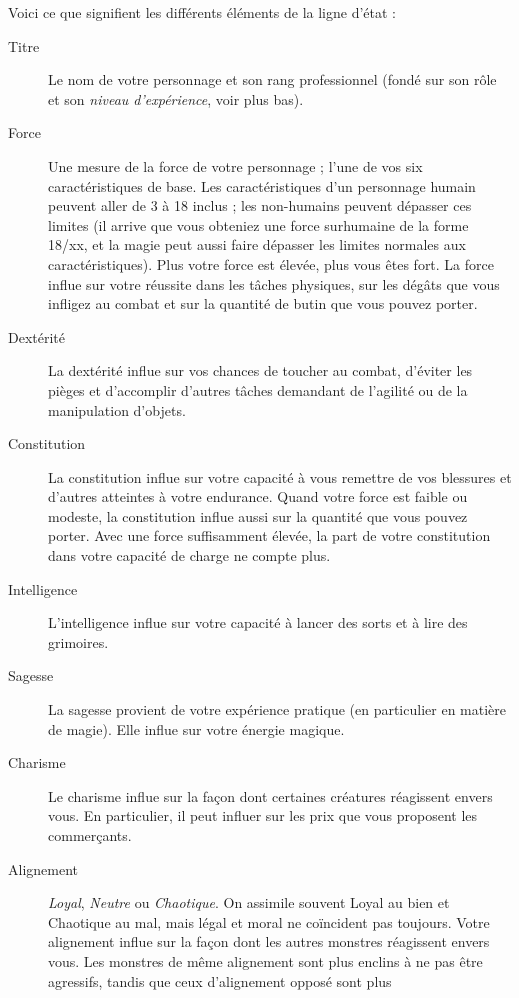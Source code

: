 \documentclass[titlepage]{article}
\begin{document}
Voici ce que signifient les différents éléments de la ligne d'état :

\begin{description}
\item[Titre]
Le nom de votre personnage et son rang professionnel (fondé sur son rôle et
son \textit{niveau d'expérience}, voir plus bas).
\item[Force]
Une mesure de la force de votre personnage ; l'une de vos six caractéristiques
de base.  Les caractéristiques d'un personnage humain peuvent aller de 3 à 18
inclus ; les non-humains peuvent dépasser ces limites
(il arrive que vous obteniez une force surhumaine de la forme 18/xx, et la
magie peut aussi faire dépasser les limites normales aux caractéristiques).
Plus votre force est élevée, plus vous êtes fort.  La force influe sur votre
réussite dans les tâches physiques, sur les dégâts que vous infligez au
combat et sur la quantité de butin que vous pouvez porter.
\item[Dextérité]
La dextérité influe sur vos chances de toucher au combat, d'éviter les pièges
et d'accomplir d'autres tâches demandant de l'agilité ou de la manipulation
d'objets.
\item[Constitution]
La constitution influe sur votre capacité à vous remettre de vos blessures et
d'autres atteintes à votre endurance.
Quand votre force est faible ou modeste, la constitution influe aussi sur la
quantité que vous pouvez porter.  Avec une force suffisamment élevée, la part
de votre constitution dans votre capacité de charge ne compte plus.
\item[Intelligence]
L'intelligence influe sur votre capacité à lancer des sorts et à lire des
grimoires.
\item[Sagesse]
La sagesse provient de votre expérience pratique (en particulier en matière de
magie).  Elle influe sur votre énergie magique.
\item[Charisme]
Le charisme influe sur la façon dont certaines créatures réagissent envers vous.
En particulier, il peut influer sur les prix que vous proposent les
commerçants.
\item[Alignement]
%
\textit{Loyal}, \textit{Neutre} ou \textit{Chaotique}.  On assimile souvent Loyal au
bien et Chaotique au mal, mais légal et moral ne coïncident pas toujours.
Votre alignement influe sur la façon dont les autres
monstres réagissent envers vous.  Les monstres de même alignement sont plus
enclins à ne pas être agressifs, tandis que ceux d'alignement opposé sont plus

\end{description}
\end{document}
